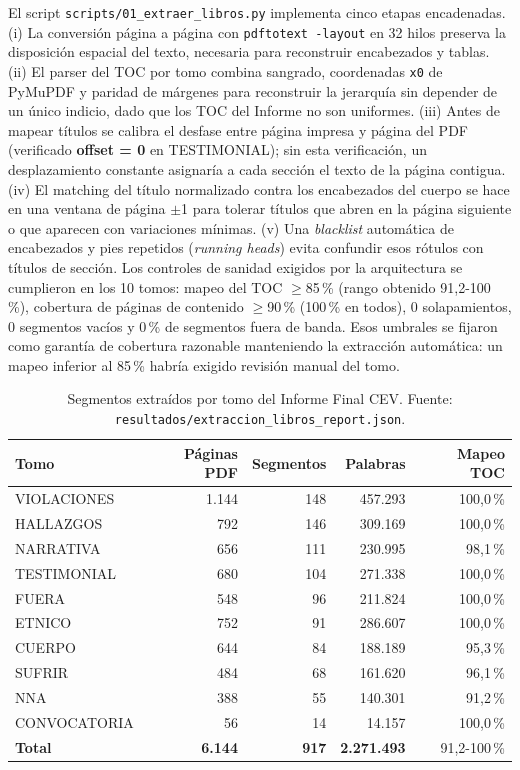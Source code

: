 \documentclass[11pt]{tg_usta}
\begin{document}
El script \texttt{scripts/01\_extraer\_libros.py} implementa cinco etapas encadenadas. (i) La conversión página a página con \texttt{pdftotext -layout} en 32 hilos preserva la disposición espacial del texto, necesaria para reconstruir encabezados y tablas. (ii) El parser del TOC por tomo combina sangrado, coordenadas \texttt{x0} de PyMuPDF y paridad de márgenes para reconstruir la jerarquía sin depender de un único indicio, dado que los TOC del Informe no son uniformes. (iii) Antes de mapear títulos se calibra el desfase entre página impresa y página del PDF (verificado \textbf{offset = 0} en TESTIMONIAL); sin esta verificación, un desplazamiento constante asignaría a cada sección el texto de la página contigua. (iv) El matching del título normalizado contra los encabezados del cuerpo se hace en una ventana de página $\pm$1 para tolerar títulos que abren en la página siguiente o que aparecen con variaciones mínimas. (v) Una \textit{blacklist} automática de encabezados y pies repetidos (\textit{running heads}) evita confundir esos rótulos con títulos de sección. Los controles de sanidad exigidos por la arquitectura se cumplieron en los 10 tomos: mapeo del TOC $\geq$85\,\% (rango obtenido 91,2-100\,\%), cobertura de páginas de contenido $\geq$90\,\% (100\,\% en todos), 0 solapamientos, 0 segmentos vacíos y 0\,\% de segmentos fuera de banda. Esos umbrales se fijaron como garantía de cobertura razonable manteniendo la extracción automática: un mapeo inferior al 85\,\% habría exigido revisión manual del tomo.

\begin{table}[htbp]
    \centering
    \caption{Segmentos extraídos por tomo del Informe Final CEV. Fuente: \texttt{resultados/extraccion\_libros\_report.json}.}
    \footnotesize
    \setlength{\tabcolsep}{4pt}
    \begin{tabular}{l r r r r}
    \toprule
    Tomo & Páginas PDF & Segmentos & Palabras & Mapeo TOC \\
    \midrule
    VIOLACIONES & 1.144 & 148 & 457.293 & 100,0\,\% \\
    HALLAZGOS   & 792   & 146 & 309.169 & 100,0\,\% \\
    NARRATIVA   & 656   & 111 & 230.995 & 98,1\,\% \\
    TESTIMONIAL & 680   & 104 & 271.338 & 100,0\,\% \\
    FUERA       & 548   & 96  & 211.824 & 100,0\,\% \\
    ETNICO      & 752   & 91  & 286.607 & 100,0\,\% \\
    CUERPO      & 644   & 84  & 188.189 & 95,3\,\% \\
    SUFRIR      & 484   & 68  & 161.620 & 96,1\,\% \\
    NNA         & 388   & 55  & 140.301 & 91,2\,\% \\
    CONVOCATORIA& 56    & 14  & 14.157  & 100,0\,\% \\
    \midrule
    \textbf{Total} & \textbf{6.144} & \textbf{917} & \textbf{2.271.493} & 91,2-100\,\% \\
    \bottomrule
    \end{tabular}
    \label{tab:segmentos}
\end{table}
\end{document}
